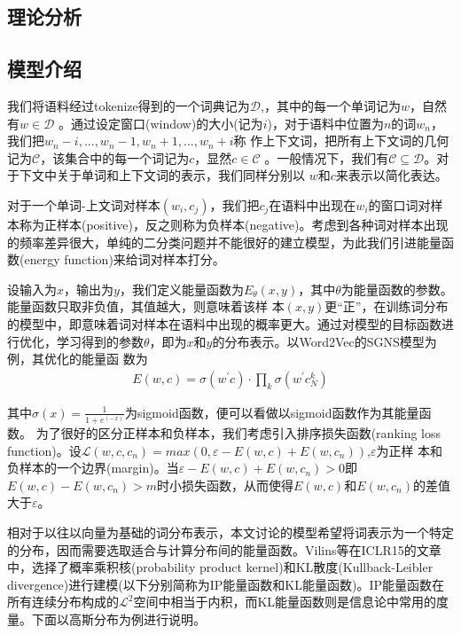 \documentclass[a4paper,13pt]{article}
\begin{document}
\begin{spacing}{1.5}
\section{理论分析}

\subsection{模型介绍}

我们将语料经过tokenize得到的一个词典记为$\mathcal{D}$,，其中的每一个单词记为$w$，自然有$w\in\mathcal{D}$
。通过设定窗口(window)的大小(记为$i$)，对于语料中位置为$n$的词$w_n$，我们把$w_n-i,...,w_n-1,w_n+1,...,w_n+i$称
作上下文词，把所有上下文词的几何记为$\mathcal{C}$，该集合中的每一个词记为$c$，显然$c\in\mathcal{C}$
。一般情况下，我们有$\mathcal{C}\subseteq\mathcal{D}$。对于下文中关于单词和上下文词的表示，我们同样分别以
$w$和$c$来表示以简化表达。

对于一个单词-上文词对样本$(w_i,c_j)$，我们把$c_j$在语料中出现在$w_i$的窗口词对样本称为正样本(positive)，反之则称为负样本(negative)。考虑到各种词对样本出现的频率差异很大，单纯的二分类问题并不能很好的建立模型，为此我们引进能量函数(energy function)来给词对样本打分。

设输入为$x$，输出为$y$，我们定义能量函数为$E_\theta(x,y)$，其中$\theta$为能量函数的参数。能量函数只取非负值，其值越大，则意味着该样
本$(x,y)$更“正”，在训练词分布的模型中，即意味着词对样本在语料中出现的概率更大。通过对模型的目标函数进行优化，学习得到的参数$\theta$，即为$x$和$y$的分布表示。以Word2Vec的SGNS模型为例，其优化的能量函
数为
\begin{align*}
E(w,c)=\sigma(w^{\prime{}}c)\cdot\prod_k\sigma(w^{\prime{}}c_N^k)
\end{align*}

其中$\sigma(x)=\frac{1}{1+e^(-x)}$为sigmoid函数，便可以看做以sigmoid函数作为其能量函数。
为了很好的区分正样本和负样本，我们考虑引入排序损失函数(ranking loss function)。设$\mathcal{L}(w,c,c_n)=max(0,\varepsilon-E(w,c)+E(w,c_n))$,$\varepsilon$为正样
本和负样本的一个边界(margin)。当$\varepsilon-E(w,c)+E(w,c_n)>0$即$E(w,c)-E(w,c_n)>m$时小损失函数，从而使得$E(w,c)$和$E(w,c_n)$的差值大于$\varepsilon$。

相对于以往以向量为基础的词分布表示，本文讨论的模型希望将词表示为一个特定的分布，因而需要选取适合与计算分布间的能量函数。Vilins等在ICLR15的文章中，选择了概率乘积核(probability product kernel)和KL散度(Kullback-Leibler divergence)进行建模(以下分别简称为IP能量函数和KL能量函数)。IP能量函数在所有连续分布构成的$\mathcal{L}^2$空间中相当于内积，而KL能量函数则是信息论中常用的度量。下面以高斯分布为例进行说明。


\end{spacing}
\end{document}
